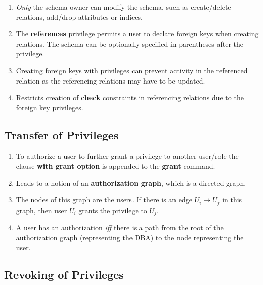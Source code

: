 \documentclass[journal,12pt,twocolumn]{IEEEtran}
\begin{document}
\begin{enumerate}
    \item \textit{Only} the schema owner can modify the schema, such as 
    create/delete relations, add/drop attributes or indices.
    \item The \textbf{references} privilege permits a user to declare foreign
    keys when creating relations. The schema can be optionally specified in 
    parentheses after the privilege.
    \item Creating foreign keys with privileges can prevent activity in 
    the referenced relation as the referencing relations may have to be
    updated.
    \item Restricts creation of \textbf{check} constraints in referencing
    relations due to the foreign key privileges.
\end{enumerate}

\subsection{Transfer of Privileges}

\begin{enumerate}
    \item To authorize a user to further grant a privilege to another user/role 
    the clause \textbf{with grant option} is appended to the \textbf{grant} 
    command.
    \item Leads to a notion of an \textbf{authorization graph}, which is a
    directed graph.
    \item The nodes of this graph are the users. If there is an edge $U_i 
    \rightarrow U_j$ in this graph, then user $U_i$ grants the privilege to 
    $U_j$.
    \item A user has an authorization \textit{iff} there is a path from the root
    of the authorization graph (representing the DBA) to the node representing
    the user.
\end{enumerate}

\subsection{Revoking of Privileges}
\end{document}
